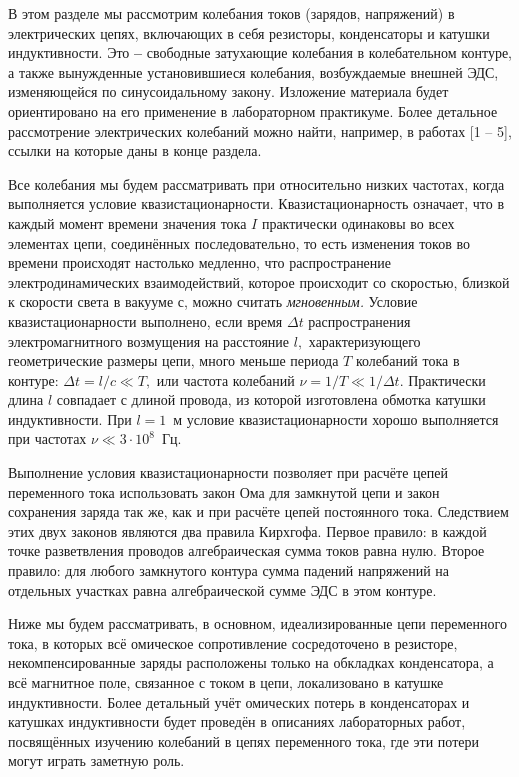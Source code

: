 \vspace{\baselineskip}

 В этом разделе мы рассмотрим колебания токов (зарядов, на\-пря\-же\-ний) в электрических цепях, включающих в себя резисторы, конденсаторы и катушки индуктивности. Это \textbf{--} свободные за\-ту\-ха\-ю\-щие колебания в колебательном контуре, а также вынужденные ус\-та\-но\-ви\-вши\-еся колебания, возбуждаемые внешней ЭДС, изменяющейся по си\-ну\-соида\-ль\-но\-му закону. Изложение материала будет ориентировано на его применение в лабораторном практикуме. Более детальное рассмотрение электрических колебаний можно найти, например, в работах [1 – 5], ссылки на которые даны в конце раздела.

Все колебания мы будем рассматривать при относительно низких частотах, когда выполняется условие ква\-зи\-ста\-ци\-о\-нар\-но\-сти. Ква\-зи\-ста\-ци\-онарность означает, что в каждый момент времени значения тока $I$ практически одинаковы во всех элементах цепи, соединённых последовательно, то есть изменения токов во времени происходят настолько медленно, что распространение электродинамических взаимодействий, которое происходит со скоростью, близкой к скорости света в вакууме $с$, можно считать \emph{мгновенным.} Условие квазистационарности выполнено, если время $\Delta t$ распространения электро\-маг\-нит\-но\-го воз\-му\-ще\-ния на расстояние $l,$ характеризующего геометрические размеры цепи, много меньше периода $T$ колебаний тока в контуре: $\Delta t=l/c\ll T,$ или частота колебаний $\nu=1/T\ll1/\Delta t.$ Практически длина $l$ совпадает с длиной провода, из которой изготовлена обмотка ка\-ту\-шки индуктивности. При $l=1$~м условие ква\-зи\-ста\-ци\-онар\-нос\-ти хорошо выполняется при частотах $\nu\ll3\cdot10^8$~Гц.

Выполнение условия квазистационарности позволяет при рас\-чё\-те цепей переменного тока использовать закон Ома для замкнутой цепи и закон сохранения заряда так же, как и при расчёте цепей постоянного тока. Следствием этих двух законов являются два правила Кирхгофа. Первое правило: в каждой точке разветвления проводов алгебраическая сумма токов равна нулю. Второе правило: для любого замкнутого контура сумма падений напряжений на отдельных участках равна алгебраической сумме ЭДС в этом кон\-ту\-ре. 

Ниже мы будем рассматривать, в основном, идеализированные цепи переменного тока, в которых всё омическое сопротивление сосредоточено в резисторе, некомпенсированные заряды рас\-по\-ло\-же\-ны только на обкладках конденсатора, а всё магнитное поле, связанное с током в цепи, локализовано в катушке индуктивности. Более детальный учёт омических потерь в конденсаторах и катушках индуктивности будет проведён в описаниях лабораторных работ, посвящённых изучению колебаний в цепях переменного тока, где эти потери могут играть заметную роль.

